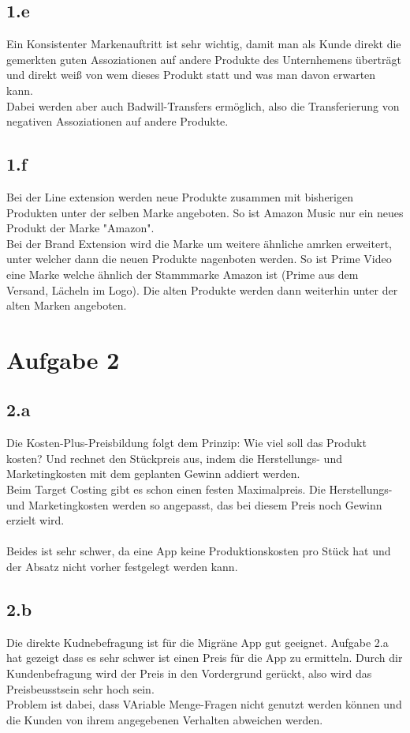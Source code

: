 \subsection{1.e}
    Ein Konsistenter Markenauftritt ist sehr wichtig, damit man als Kunde direkt die gemerkten guten Assoziationen auf andere Produkte des Unternhemens überträgt und direkt weiß von wem dieses Produkt statt und was man davon erwarten kann. \\
    Dabei werden aber auch Badwill-Transfers ermöglich, also die Transferierung von negativen Assoziationen auf andere Produkte.

\subsection{1.f}
    Bei der Line extension werden neue Produkte zusammen mit bisherigen Produkten unter der selben Marke angeboten. So ist Amazon Music nur ein neues Produkt der Marke "Amazon".\\
    Bei der Brand Extension wird die Marke um weitere ähnliche amrken erweitert, unter welcher dann die neuen Produkte nagenboten werden. So ist Prime Video eine Marke welche ähnlich der Stammmarke Amazon ist (Prime aus dem Versand, Lächeln im Logo).
    Die alten Produkte werden dann weiterhin unter der alten Marken angeboten.


\section{Aufgabe 2}
\subsection{2.a}
    Die Kosten-Plus-Preisbildung folgt dem Prinzip: Wie viel soll das Produkt kosten? Und rechnet den Stückpreis aus, indem die Herstellungs- und Marketingkosten mit dem geplanten Gewinn addiert werden. \\
    Beim Target Costing gibt es schon einen festen Maximalpreis. Die Herstellungs- und Marketingkosten werden so angepasst, das bei diesem Preis noch Gewinn erzielt wird. \\
    \ \\
    Beides ist sehr schwer, da eine App keine Produktionskosten pro Stück hat und der Absatz nicht vorher festgelegt werden kann. \\

\subsection{2.b}
    Die direkte Kudnebefragung ist für die Migräne App gut geeignet. Aufgabe 2.a hat gezeigt dass es sehr schwer ist einen Preis für die App zu ermitteln. Durch dir Kundenbefragung wird der Preis in den Vordergrund gerückt, also wird das Preisbeusstsein sehr hoch sein. \\
    Problem ist dabei, dass VAriable Menge-Fragen nicht genutzt werden können und die Kunden von ihrem angegebenen Verhalten abweichen werden.

